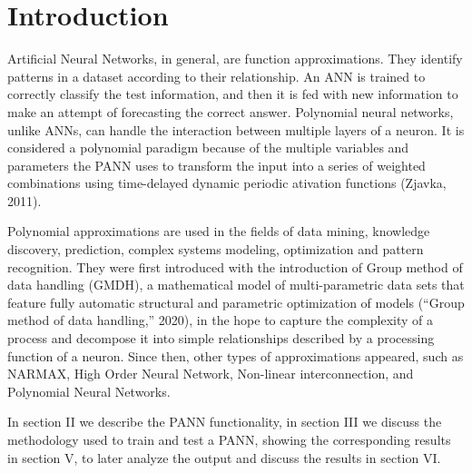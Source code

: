 \documentclass[conference,final,]{IEEEtran}
\begin{document}

%
\IEEEpeerreviewmaketitle


\hypertarget{introduction}{%
\section{Introduction}\label{introduction}}

Artificial Neural Networks, in general, are function approximations.
They identify patterns in a dataset according to their relationship. An
ANN is trained to correctly classify the test information, and then it
is fed with new information to make an attempt of forecasting the
correct answer. Polynomial neural networks, unlike ANNs, can handle the
interaction between multiple layers of a neuron. It is considered a
polynomial paradigm because of the multiple variables and parameters the
PANN uses to transform the input into a series of weighted combinations
using time-delayed dynamic periodic ativation functions (Zjavka, 2011).

Polynomial approximations are used in the fields of data mining,
knowledge discovery, prediction, complex systems modeling, optimization
and pattern recognition. They were first introduced with the
introduction of Group method of data handling (GMDH), a mathematical
model of multi-parametric data sets that feature fully automatic
structural and parametric optimization of models (``Group method of data
handling,'' 2020), in the hope to capture the complexity of a process
and decompose it into simple relationships described by a processing
function of a neuron. Since then, other types of approximations
appeared, such as NARMAX, High Order Neural Network, Non-linear
interconnection, and Polynomial Neural Networks.

In section II we describe the PANN functionality, in section III we
discuss the methodology used to train and test a PANN, showing the
corresponding results in section V, to later analyze the output and
discuss the results in section VI.
\end{document}
